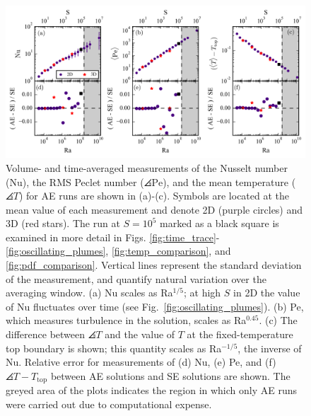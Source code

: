 \begin{figure}[ht!]
\vspace{-1.5cm}
\includegraphics[width=\textwidth]{./figs/parameter_space_comparison.png}
\caption{Volume- and time-averaged measurements of the Nusselt number (Nu), the
RMS Peclet number ($\angles{\text{Pe}}$), and the mean temperature ($\angles{T}$) for AE runs are shown in (a)-(c).
Symbols are located at the mean value of
each measurement and denote 2D (purple circles) and 3D (red stars). 
The run at $S = 10^5$ marked as a
black square is examined in more detail in Figs. \ref{fig:time_trace}-\ref{fig:oscillating_plumes},
\ref{fig:temp_comparison}, and \ref{fig:pdf_comparison}.
Vertical lines represent the standard deviation of the measurement,
and quantify natural variation over the averaging window. 
(a) Nu scales as Ra$^{1/5}$; at high $S$ in 2D the value of Nu fluctuates over time
(see Fig.~\ref{fig:oscillating_plumes}).  
(b) Pe, which measures turbulence in the solution, scales as
Ra$^{0.45}$. (c) The difference between $\angles{T}$ and the value of $T$ at the fixed-temperature
top boundary is shown; this quantity scales as Ra$^{-1/5}$, the inverse of Nu.
Relative error for measurements of (d) Nu, (e) Pe, and (f) $\angles{T} - T_{\text{top}}$ between 
AE solutions and SE solutions are shown.
The greyed area of the plots indicates the region in which only AE runs were
carried out due to computational expense. \label{fig:parameter_space_comparison} }
\end{figure}




